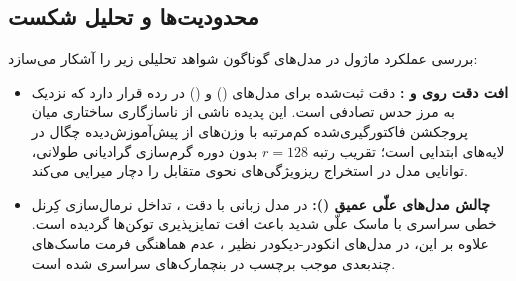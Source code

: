 \subsection{محدودیت‌ها و تحلیل شکست}
بررسی عملکرد ماژول در مدل‌های گوناگون شواهد تحلیلی زیر را آشکار می‌سازد:
\begin{itemize}
    \item \textbf{افت دقت روی  و :} دقت ثبت‌شده برای مدل‌های  () و  () در رده  قرار دارد که نزدیک به مرز حدس تصادفی است. این پدیده ناشی از ناسازگاری ساختاری میان پروجکشن فاکتورگیری‌شده کم‌مرتبه با وزن‌های از پیش‌آموزش‌دیده چگال در لایه‌های ابتدایی است؛ تقریب رتبه $r=128$ بدون دوره گرم‌سازی گرادیانی طولانی، توانایی مدل در استخراج ریزویژگی‌های نحوی متقابل را دچار میرایی می‌کند.
    \item \textbf{چالش مدل‌های علّی عمیق ():} در مدل زبانی  با دقت ، تداخل نرمال‌سازی کِرنل خطی سراسری با ماسک علّی شدید باعث افت تمایزپذیری توکن‌ها گردیده است. علاوه بر این، در مدل‌های انکودر-دیکودر نظیر ، عدم هماهنگی فرمت ماسک‌های چندبعدی موجب برچسب  در بنچمارک‌های سراسری شده است.
\end{itemize}
